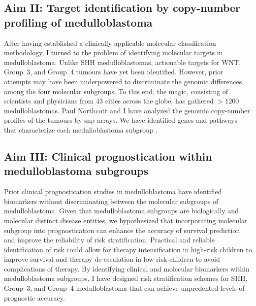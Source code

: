 \subsection*{Aim II: Target identification by copy-number profiling of medulloblastoma}

After having established a clinically applicable molecular classification methodology, I turned to the problem of identifying molecular targets in medulloblastoma. Unlike SHH medulloblastomas, actionable targets for WNT, Group~3, and Group~4 tumours have yet been identified. However, prior attempts may have been underpowered to discriminate the genomic differences among the four molecular subgroups. To this end, the \gls{magic}, consisting of scientists and physicians from 43 cities across the globe, has gathered $>1200$ medulloblastomas. Paul Northcott and I have analyzed the genomic copy-number profiles of the tumours by \gls{snp} arrays. We have identified genes and pathways that characterize each medulloblastoma subgroup .


\subsection*{Aim III: Clinical prognostication within medulloblastoma subgroups}

Prior clinical prognostication studies in medulloblastoma have identified biomarkers without discriminating between the molecular subgroups of medulloblastoma. Given that medulloblastoma subgroups are biologically and molecular distinct disease entities, we hypothesized that incorporating molecular subgroup into prognostication can enhance the accuracy of survival prediction and improve the reliability of risk stratification. Practical and reliable identification of risk could allow for therapy intensification in high-risk children to improve survival and therapy de-escalation in low-risk children to avoid complications of therapy. By identifying clinical and molecular biomarkers within medulloblastoma subgroups, I have designed risk stratification schemes for SHH, Group~3, and Group~4 medulloblastoma that can achieve unpredented levels of prognostic accuracy.
